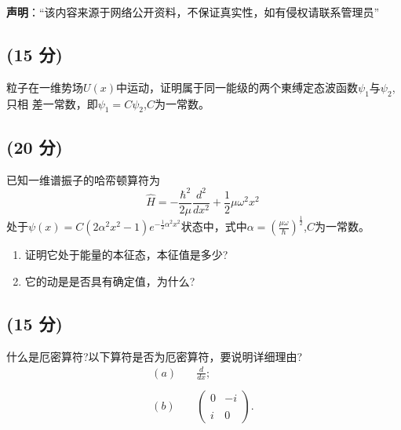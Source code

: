 
\textbf{声明}：“该内容来源于网络公开资料，不保证真实性，如有侵权请联系管理员”

\subsection{(15 分)}
粒子在一维势场$U(x)$中运动，证明属于同一能级的两个東缚定态波函数$\psi_1$与$\psi_2$,只相
差一常数，即$\psi_1=C\psi_2$,$C$为一常数。
\subsection{(20 分)}
已知一维谱振子的哈帟顿算符为$$\hat{H} = -\frac{\hbar^2}{2\mu} \frac{d^2}{dx^2} + \frac{1}{2}\mu \omega^2 x^2~$$处于$\psi(x) = C(2\alpha^2x^2 - 1)e^{-\frac{1}{2}\alpha^2x^2}$状态中，式中$\alpha = \left( \frac{\mu \omega}{\hbar} \right)^{\frac{1}{2}}$,$C$为一常数。
\begin{enumerate}
\item 证明它处于能量的本征态，本征值是多少?
\item 它的动是是否具有确定值，为什么?
\end{enumerate}
\subsection{(15 分)}
什么是厄密算符?以下算符是否为厄密算符，要说明详细理由?
\begin{equation}
\begin{aligned}
(a) & \quad \frac{d}{dx}; \\\\
(b) & \quad \begin{pmatrix}
0 & -i \\\\
i & 0
\end{pmatrix}.
\end{aligned}~
\end{equation}

